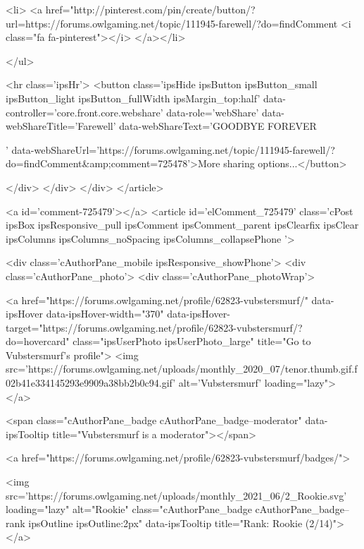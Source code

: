 			<li>
<a href="http://pinterest.com/pin/create/button/?url=https://forums.owlgaming.net/topic/111945-farewell/?do=findComment%
	<i class="fa fa-pinterest"></i>
</a></li>
		
	</ul>


	<hr class='ipsHr'>
	<button class='ipsHide ipsButton ipsButton_small ipsButton_light ipsButton_fullWidth ipsMargin_top:half' data-controller='core.front.core.webshare' data-role='webShare' data-webShareTitle='Farewell' data-webShareText='GOODBYE FOREVER
 
' data-webShareUrl='https://forums.owlgaming.net/topic/111945-farewell/?do=findComment&amp;comment=725478'>More sharing options...</button>

	
</div>
</div>
	</div>
</article>
					
				
					
					
					



<a id='comment-725479'></a>
<article  id='elComment_725479' class='cPost ipsBox ipsResponsive_pull  ipsComment  ipsComment_parent ipsClearfix ipsClear ipsColumns ipsColumns_noSpacing ipsColumns_collapsePhone    '>
	

	

	<div class='cAuthorPane_mobile ipsResponsive_showPhone'>
		<div class='cAuthorPane_photo'>
			<div class='cAuthorPane_photoWrap'>
				


	<a href="https://forums.owlgaming.net/profile/62823-vubstersmurf/" data-ipsHover data-ipsHover-width="370" data-ipsHover-target="https://forums.owlgaming.net/profile/62823-vubstersmurf/?do=hovercard" class="ipsUserPhoto ipsUserPhoto_large" title="Go to Vubstersmurf's profile">
		<img src='https://forums.owlgaming.net/uploads/monthly_2020_07/tenor.thumb.gif.f02b41e334145293e9909a38bb2b0c94.gif' alt='Vubstersmurf' loading="lazy">
	</a>

				
				<span class="cAuthorPane_badge cAuthorPane_badge--moderator" data-ipsTooltip title="Vubstersmurf is a moderator"></span>
				
				
					<a href="https://forums.owlgaming.net/profile/62823-vubstersmurf/badges/">
						
<img src='https://forums.owlgaming.net/uploads/monthly_2021_06/2_Rookie.svg' loading="lazy" alt="Rookie" class="cAuthorPane_badge cAuthorPane_badge--rank ipsOutline ipsOutline:2px" data-ipsTooltip title="Rank: Rookie (2/14)">
					</a>
				
